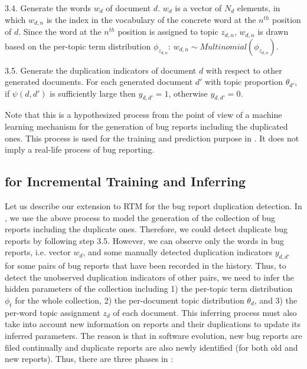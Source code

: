 3.4. Generate the words $w_d$ of document $d$. $w_d$ is a vector of $N_d$
     elements, in which $w_{d,n}$ is the index in the vocabulary of
     the concrete word at the $n^{th}$ position of $d$. Since the
     word at the $n^{th}$ position is assigned to topic $z_{d,n}$,
     $w_{d,n}$ is drawn based on the per-topic term distribution
     $\phi_{z_{d,n}}$: $w_{d,n} \sim Multinomial(\phi_{z_{d,n}})$.

3.5. Generate the duplication indicators of document $d$ with respect
     to other generated documents. For each generated document $d'$
     with topic proportion $\theta_{d'}$, if $\psi(d, d')$ is sufficiently large
     then $y_{d,d'} = 1$, otherwise $y_{d,d'} = 0$.



Note that this is a hypothesized process from the point of view of a
machine learning mechanism for the generation of bug reports including
the duplicated ones. This process is used for the training and
prediction purpose in {\model}. It does not imply a real-life process
of bug reporting.


\subsection{{\model} for Incremental Training and Inferring}

Let us describe our extension to RTM for the bug report duplication
detection. In {\model}, we use the above process to model the
generation of the collection of bug reports including the duplicate
ones. Therefore, we could detect duplicate bug reports by following
step 3.5. However, we can observe only the words in bug reports,
i.e. vector $w_d$, and some manually detected duplication indicators
$y_{d,d'}$ for some pairs of bug reports that have been recorded in
the history. Thus, to detect the unobserved duplication indicators of
other pairs, we need to infer the hidden parameters of the collection
including 1) the per-topic term distribution $\phi_t$ for the whole
collection, 2) the per-document topic distribution $\theta_d$, and 3)
the per-word topic assignment $z_d$ of each document. This inferring
process must also take into account new information on reports and
their duplications to update its inferred parameters. The reason is
that in software evolution, new bug reports are filed continually and
duplicate reports are also newly identified (for both old and new
reports). Thus, there are three phases in {\model}:

